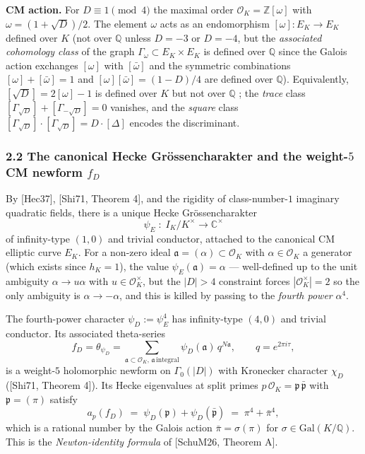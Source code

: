 \documentclass[
  11pt,
  a4paper,
]{amsart}
\begin{document}
\textbf{CM action.} For \(D \equiv 1 \pmod 4\) the maximal order \(\mathcal{O}_K = \mathbb{Z}[\omega]\) with \(\omega = (1 + \sqrt D)/2\). The element \(\omega\) acts as an endomorphism \([\omega] : E_K \to E_K\) defined over \(K\) (not over \(\mathbb{Q}\) unless \(D = -3\) or \(D = -4\), but the \emph{associated cohomology class} of the graph \(\Gamma_\omega \subset E_K \times E_K\) is defined over \(\mathbb{Q}\) since the Galois action exchanges \([\omega]\) with \([\bar\omega]\) and the symmetric combinations \([\omega] + [\bar\omega] = 1\) and \([\omega][\bar\omega] = (1 - D)/4\) are defined over \(\mathbb{Q}\)). Equivalently, \([\sqrt D] = 2[\omega] - 1\) is defined over \(K\) but not over \(\mathbb{Q}\) ; the \emph{trace} class \([\Gamma_{\sqrt D}] + [\Gamma_{-\sqrt D}] = 0\) vanishes, and the \emph{square} class \([\Gamma_{\sqrt D}]\cdot [\Gamma_{\sqrt D}] = D \cdot [\Delta]\) encodes the discriminant.

\hypertarget{the-canonical-hecke-gruxf6ssencharakter-and-the-weight-5-cm-newform-f_d}{%
\subsubsection{\texorpdfstring{2.2 The canonical Hecke Grössencharakter and the weight-\(5\) CM newform \(f_D\)}{2.2 The canonical Hecke Grössencharakter and the weight-5 CM newform f\_D}}\label{the-canonical-hecke-gruxf6ssencharakter-and-the-weight-5-cm-newform-f_d}}

By {[}Hec37{]}, {[}Shi71, Theorem 4{]}, and the rigidity of class-number-\(1\) imaginary quadratic fields, there is a unique Hecke Grössencharakter
\[
\psi_E \;:\; I_K / K^\times \to \mathbb{C}^\times
\]
of infinity-type \((1, 0)\) and trivial conductor, attached to the canonical CM elliptic curve \(E_K\). For a non-zero ideal \(\mathfrak{a} = (\alpha) \subset \mathcal{O}_K\) with \(\alpha \in \mathcal{O}_K\) a generator (which exists since \(h_K = 1\)), the value \(\psi_E(\mathfrak{a}) = \alpha\) --- well-defined up to the unit ambiguity \(\alpha \to u\alpha\) with \(u \in \mathcal{O}_K^\times\), but the \(|D| > 4\) constraint forces \(|\mathcal{O}_K^\times| = 2\) so the only ambiguity is \(\alpha \to -\alpha\), and this is killed by passing to the \emph{fourth power} \(\alpha^4\).

The fourth-power character \(\psi_D := \psi_E^4\) has infinity-type \((4, 0)\) and trivial conductor. Its associated theta-series
\[
f_D = \theta_{\psi_D} = \sum_{\mathfrak{a} \subset \mathcal{O}_K, \,\mathfrak{a}\,\text{integral}} \psi_D(\mathfrak{a})\,q^{N\mathfrak{a}}, \qquad q = e^{2\pi i \tau},
\]
is a weight-\(5\) holomorphic newform on \(\Gamma_0(|D|)\) with Kronecker character \(\chi_D\) ({[}Shi71, Theorem 4{]}). Its Hecke eigenvalues at split primes \(p\,\mathcal{O}_K = \mathfrak{p}\,\bar{\mathfrak{p}}\) with \(\mathfrak{p} = (\pi)\) satisfy
\begin{equation}
a_p(f_D) \;=\; \psi_D(\mathfrak{p}) + \psi_D(\bar{\mathfrak{p}}) \;=\; \pi^4 + \bar\pi^4,
\tag{2.1}
\end{equation}
which is a rational number by the Galois action \(\bar\pi = \sigma(\pi)\) for \(\sigma \in \mathrm{Gal}(K/\mathbb{Q})\). This is the \emph{Newton-identity formula} of {[}SchuM26, Theorem A{]}.
\end{document}

